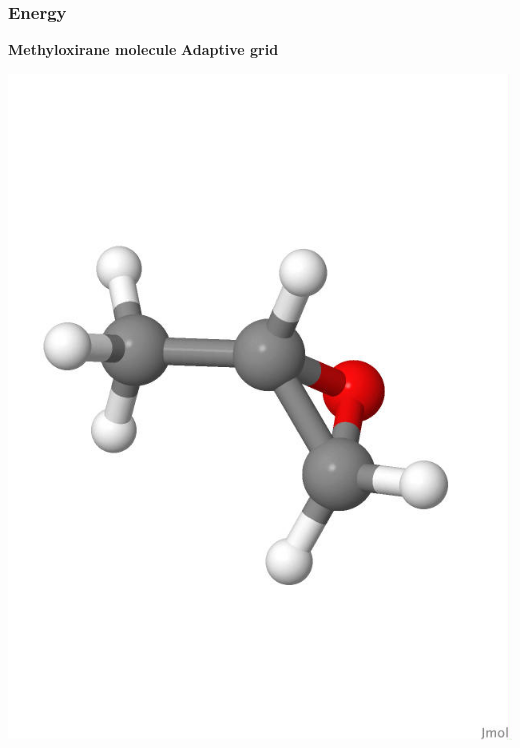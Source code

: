 \begin{frame}
\frametitle{Energy}

\centering
\textbf{Methyloxirane molecule}
\hspace{30mm}
\textbf{Adaptive grid}
\begin{minipage}{0.5\textwidth}
\centering
\includegraphics[scale=0.15, viewport = 0 180 550 650, clip]{figures/methyloxirane_white.jpg}
\end{minipage}%
\begin{minipage}{0.5\textwidth}
\centering

\end{minipage}
\end{frame}
